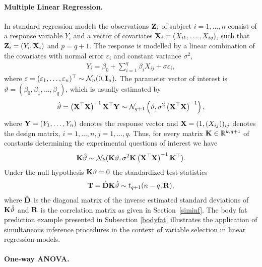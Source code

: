 \documentclass[12pt]{article}
\begin{document}
\paragraph{Multiple Linear Regression.}

In standard regression models the observations $\mathbf{Z}_i$ of subject
$i=1, \ldots, n$ consist of a response variable $Y_i$ and a
vector of covariates $\mathbf{X}_i = (X_{i1}, \dots, X_{iq})$, such that
$\mathbf{Z}_i = (Y_i, \mathbf{X}_i)$ and $p = q + 1$. The response is modelled by a linear
combination of the covariates with normal error $\varepsilon_i$ and
constant variance $\sigma^2$,
\begin{eqnarray*}
Y_i = \beta_0 + \sum_{i = 1}^q \beta_i X_{ij} + \sigma \varepsilon_i,
\end{eqnarray*}
where $\varepsilon = (\varepsilon_1, \dots, \varepsilon_n)^\top \sim \mathcal{N}_n(0, \mathbf{I}_n).$
The parameter vector of interest is $\vartheta = (\beta_0, \beta_1, \dots, \beta_q)$,
which is usually estimated by
\begin{eqnarray*}
\hat{\vartheta} = \left(\mathbf{X}^\top\mathbf{X}\right)^{-1} \mathbf{X}^\top \mathbf{Y}
\sim \mathcal{N}_{q+1}\left(\vartheta, \sigma^2 \left(\mathbf{X}^\top\mathbf{X}\right)^{-1}\right),
\end{eqnarray*}
where $\mathbf{Y} = (Y_1, \dots, Y_n)$ denotes the response vector and $\mathbf{X}
= (1, (X_{ij}))_{ij}$ denotes the design matrix, $i = 1, \dots, n,
j = 1, \dots, q$. Thus, for every matrix $\mathbf{K} \in \mathbb{R}^{k,q+1}$ of
constants determining the experimental questions of interest we
have
\begin{eqnarray*}
\mathbf{K} \hat{\vartheta} \sim \mathcal{N}_k(\mathbf{K} \vartheta, \sigma^2 \mathbf{K} \left(\mathbf{X}^\top\mathbf{X}\right)^{-1} \mathbf{K}^\top).
\end{eqnarray*}
Under the null hypothesis $\mathbf{K} \vartheta = 0$ the standardized test statistics
\begin{eqnarray*}
\mathbf{T} = \hat{\mathbf{D}} \mathbf{K} \hat{\vartheta} \sim t_{q+1}(n - q, \mathbf{R}),
\end{eqnarray*}
where $\hat{\mathbf{D}}$ is the diagonal matrix of the inverse estimated
standard deviations of $\mathbf{K} \hat{\vartheta}$ and $\mathbf{R}$ is the correlation matrix
as given in Section~\ref{siminf}. The body fat prediction example
presented in Subsection \ref{bodyfat} illustrates the application of simultaneous
inference procedures in the context of variable selection in linear regression models.

\paragraph{One-way ANOVA.}
\end{document}
